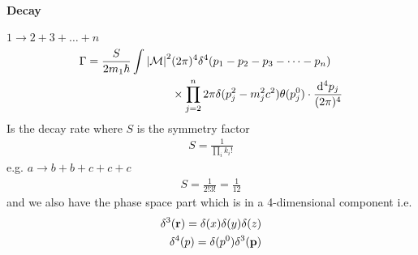 \documentclass[../main.tex]{subfiles}
\begin{document}
\paragraph*{Decay} $1 \to 2 + 3 + \dots + n$ 
\begin{align*}
    \Gamma = \frac{S}{2m_1 \hbar} \int \abs{\mathcal{M}}^2 &(2\pi)^4 \delta^4(p_1 - p_2 - p_3 - \dots - p_n) \\
    &\times \prod_{j = 2}^n 2\pi \delta(p_j^2 - m_j^2 c^2) \theta(p_j^0) 
    \cdot \frac{\dd^4 p_j}{(2\pi)^4}
\end{align*}
Is the decay rate where $S$ is the symmetry factor
\begin{align*}
    S = \frac{1}{\prod_i k_i!}
\end{align*}
e.g. $a \to b + b + c + c +c$
\begin{align*}
    S = \frac{1}{2!3!} = \frac{1}{12}
\end{align*}
and we also have the phase space part which is in a 4-dimensional component i.e.
\begin{align*}
    \delta^3(\vb r) = \delta(x) \delta(y) \delta(z) \\
    \delta^4(p) = \delta(p^0) \delta^3(\vb p)
\end{align*}
\end{document}
